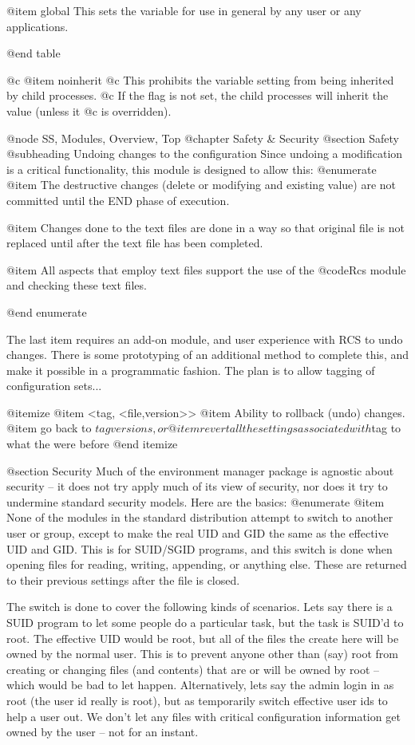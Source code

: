 {{@item global
This sets the variable for use in general by any user or any applications.

@end table


@c @item noinherit
@c This prohibits the variable setting from being inherited by child processes.
@c If the flag is not set, the child processes will inherit the value (unless it
@c is overridden).

@node SS, Modules, Overview, Top
@chapter Safety & Security
@section Safety
@subheading Undoing changes to the configuration
Since undoing a modification is a critical functionality, this module is
designed to allow this:
@enumerate
@item The destructive changes (delete or modifying and existing value) are not
committed until the END phase of execution.

@item Changes done to the text files are done in a way so that original file
is not replaced until after the text file has been completed.

@item All aspects that employ text files support the use of the @code{Rcs}
module and checking these text files.

@end enumerate

The last item requires an add-on module, and user experience with RCS to
undo changes.  There is some prototyping of an additional method to complete
this, and make it possible in a programmatic fashion.  The plan is to allow
tagging of configuration sets...

@itemize
@item <tag, {<file,version>}>
@item Ability to rollback (undo) changes.
@item go back to $tag versions, or
@item revert all the settings associated with $tag to what the were before
@end itemize

@section Security
Much of the environment manager package is agnostic about security -- it does
not try apply much of its view of security, nor does it try to undermine
standard security models.   Here are the basics:
@enumerate
@item None of the modules in the standard distribution attempt to switch
to another user or group, except to make the real UID and GID the same as the
effective UID and GID.  This is for SUID/SGID programs, and this switch is
done when opening files for reading, writing, appending, or anything else.
These are returned to their previous settings after the file is closed.

The switch is done to cover the following kinds of scenarios.  Lets say there
is a SUID program to let some people do a particular task, but the task is
SUID'd to root.  The effective UID would be root, but all of the files the
create here will be owned by the normal user.  This is to prevent anyone
other than (say) root from creating or changing files (and contents) that
are or will be owned by root --  which would be bad to let happen.
Alternatively, lets say the admin login in as root (the user id really is
root),  but as temporarily switch effective user ids to help a user out.
We don't let any files with critical configuration information
get owned by the user -- not for an instant.

}}
